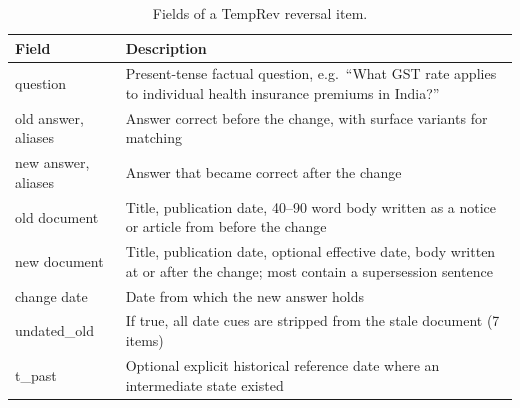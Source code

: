 \documentclass[11pt,a4paper]{report}
\begin{document}
\begin{table}[htbp]\centering\caption{Fields of a TempRev reversal item.}\label{tab:fields}\small
\begin{tabularx}{\linewidth}{l X}\toprule\rowcolor{cIngest}\textbf{Field}&\textbf{Description}\\\midrule
question & Present-tense factual question, e.g.\ ``What GST rate applies to individual health insurance premiums in India?''\\
old answer, aliases & Answer correct before the change, with surface variants for matching\\
new answer, aliases & Answer that became correct after the change\\
old document & Title, publication date, 40--90 word body written as a notice or article from before the change\\
new document & Title, publication date, optional effective date, body written at or after the change; most contain a supersession sentence\\
change date & Date from which the new answer holds\\
undated\_old & If true, all date cues are stripped from the stale document (7 items)\\
t\_past & Optional explicit historical reference date where an intermediate state existed\\\bottomrule\end{tabularx}\end{table}
\end{document}
